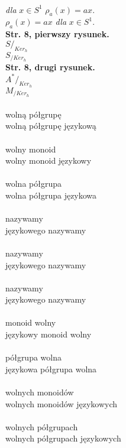 \documentclass[a4paper,11pt]{article}
\begin{document}
\noindent
{} \\
\Jest  \textit{dla} $x \in S^{ 1 }$ $\rho_{ a }( x )= a x$. \\
\Powin $\rho_{ a }( x ) = a x$ \textit{dla} $x \in S^{ 1 }$. \\
\textbf{Str. 8, pierwszy rysunek.} \\
\Jest  $S /_{ Ker_{ h } }$ \\
\Powin $S_{ / Ker_{ h } }$ \\
\textbf{Str. 8, drugi rysunek.} \\
\Jest  $A^{ * } /_{ Ker_{ h } }$ \\
\Powin $M_{ / Ker_{ h } }$ \\
 \\
\Jest  wolną półgrupę \\
\Powin wolną półgrupę językową \\
 \\
\Jest  wolny monoid \\
\Powin wolny monoid językowy \\
 \\
\Jest  wolna półgrupa \\
\Powin wolna półgrupa językowa \\
 \\
\Jest  nazywamy \\
\Powin językowego nazywamy \\
 \\
\Jest  nazywamy \\
\Powin językowego nazywamy \\
 \\
\Jest  nazywamy \\
\Powin językowego nazywamy \\
 \\
\Jest  monoid wolny \\
\Powin językowy monoid wolny \\
 \\
\Jest  półgrupa wolna \\
\Powin językowa półgrupa wolna \\
 \\
\Jest  wolnych monoidów \\
\Powin wolnych monoidów językowych \\
 \\
\Jest  wolnych półgrupach \\
\Powin wolnych półgrupach językowych \\
\end{document}
